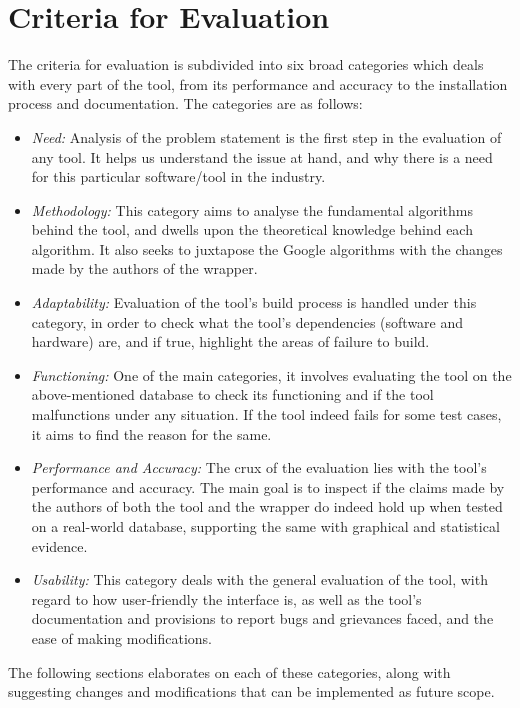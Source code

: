 \documentclass[acmsmall]{acmart}
\begin{document}
\section{Criteria for Evaluation}\label{3}
The criteria for evaluation is subdivided into six broad categories which deals with every part of the tool, from its performance and accuracy to the installation process and documentation. The categories are as follows:
\begin{itemize}
    \item 
    \textit{Need: } Analysis of the problem statement is the first step in the evaluation of any tool. It helps us understand the issue at hand, and why there is a need for this particular software/tool in the industry.
    \item
    \textit{Methodology: } This category aims to analyse the fundamental algorithms behind the tool, and dwells upon the theoretical knowledge behind each algorithm. It also seeks to juxtapose the Google algorithms with the changes made by the authors of the wrapper.
    \item
    \textit{Adaptability: } Evaluation of the tool’s build process is handled under this category, in order to check what the tool’s dependencies (software and hardware) are, and if true,  highlight the areas of failure to build.
    \item
    \textit{Functioning: } One of the main categories, it involves evaluating the tool on the above-mentioned database to check its functioning and if the tool malfunctions under any situation. If the tool indeed fails for some test cases, it aims to find the reason for the same.
    \item
    \textit{Performance and Accuracy: } The crux of the evaluation lies with the tool’s performance and accuracy. The main goal is to inspect if the claims made by the authors of both the tool and the wrapper do indeed hold up when tested on a real-world database, supporting the same with graphical and statistical evidence.
    \item
    \textit{Usability: } This category deals with the general evaluation of the tool, with regard to how user-friendly the interface is, as well as the tool’s documentation and provisions to report bugs and grievances faced, and the ease of making modifications.
\end{itemize}

The following sections elaborates on each of these categories, along with suggesting changes and modifications that can be implemented as future scope. 
\end{document}
